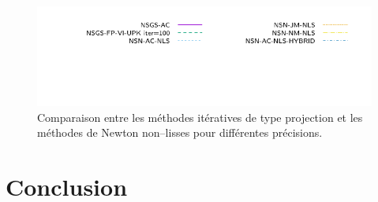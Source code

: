\documentclass{CSMA2017}
\begin{document}
\begin{figure}[htbp]
   \includegraphics{figure/LowWall_FEM.1e-2.with_guess/simple/profile-LMGC_LowWall_FEM_legend.pdf}
  \caption{Comparaison entre les méthodes itératives de type projection et les méthodes de Newton non--lisses pour différentes précisions.}
  \label{fig:LowWall_FEM.simple}
\end{figure}






\newpage
\section{Conclusion}
\end{document}
